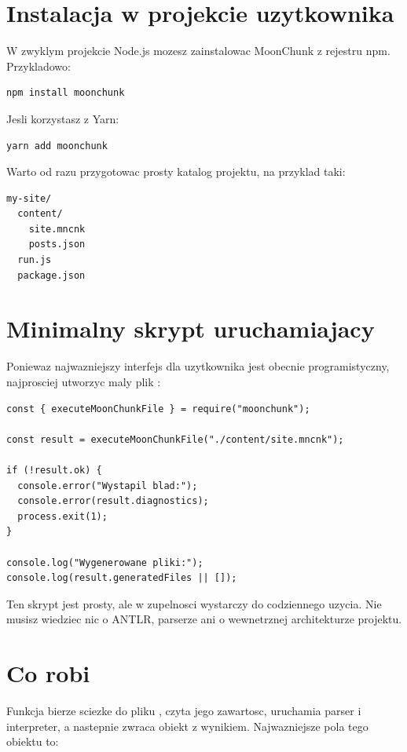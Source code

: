 \section{Instalacja w projekcie uzytkownika}
W zwyklym projekcie Node.js mozesz zainstalowac MoonChunk z rejestru npm.
Przykladowo:

\begin{lstlisting}[style=basecode,caption={Instalacja pakietu MoonChunk w projekcie uzytkownika}]
npm install moonchunk
\end{lstlisting}

Jesli korzystasz z Yarn:

\begin{lstlisting}[style=basecode,caption={Instalacja pakietu przez Yarn}]
yarn add moonchunk
\end{lstlisting}

Warto od razu przygotowac prosty katalog projektu, na przyklad taki:

\begin{lstlisting}[style=basecode,caption={Przykladowy uklad plikow projektu}]
my-site/
  content/
    site.mncnk
    posts.json
  run.js
  package.json
\end{lstlisting}

\section{Minimalny skrypt uruchamiajacy}
Poniewaz najwazniejszy interfejs dla uzytkownika jest obecnie programistyczny,
najprosciej utworzyc maly plik :

\begin{lstlisting}[style=basecode,caption={Najprostszy runner MoonChunk w JavaScript}]
const { executeMoonChunkFile } = require("moonchunk");

const result = executeMoonChunkFile("./content/site.mncnk");

if (!result.ok) {
  console.error("Wystapil blad:");
  console.error(result.diagnostics);
  process.exit(1);
}

console.log("Wygenerowane pliki:");
console.log(result.generatedFiles || []);
\end{lstlisting}

Ten skrypt jest prosty, ale w zupelnosci wystarczy do codziennego uzycia. Nie musisz
wiedziec nic o ANTLR, parserze ani o wewnetrznej architekturze projektu.

\section{Co robi }
Funkcja  bierze sciezke do pliku , czyta
jego zawartosc, uruchamia parser i interpreter, a nastepnie zwraca obiekt z wynikiem.
Najwazniejsze pola tego obiektu to:

